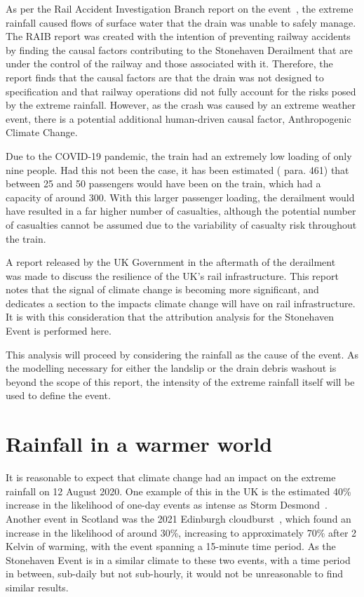\documentclass[12pt,a4paper,openany]{report}
\begin{document}
As per the Rail Accident Investigation Branch report on the event~\cite{RAIB_2022},
    the extreme rainfall caused flows of surface water that the drain was unable to safely manage.
The RAIB report was created with the intention of preventing railway accidents by finding the causal
    factors contributing to the Stonehaven Derailment that are under the control of the railway
    and those associated with it.
Therefore,
    the report finds that the causal factors are that the drain was not designed to specification
    and that railway operations did not fully account for the risks posed by the extreme rainfall.
However,
    as the crash was caused by an extreme weather event,
    there is a potential additional human-driven causal factor, Anthropogenic Climate Change.

Due to the COVID-19 pandemic,
    the train had an extremely low loading of only nine people.
Had this not been the case,
    it has been estimated (\cite{RAIB_2022} para. 461) that between 25 and 50 passengers would have been on the train,
    which had a capacity of around 300.
With this larger passenger loading,
    the derailment would have resulted in a far higher number of casualties,
    although the potential number of casualties cannot be assumed due to the variability of casualty risk throughout the train.

A report released by the UK Government in the aftermath of the derailment~\cite{NR_DfT_2021}
    was made to discuss the resilience of the UK's rail infrastructure.
This report notes that the signal of climate change is becoming more significant,
    and dedicates a section to the impacts climate change will have on rail infrastructure.
It is with this consideration that the attribution analysis for the Stonehaven Event is performed here.

This analysis will proceed by considering the rainfall as the cause of the event.
As the modelling necessary for either the landslip or the drain debris washout is beyond the scope of this report,
    the intensity of the extreme rainfall itself will be used to define the event.

\section{Rainfall in a warmer world}\label{sec:warmerrainfall}

It is reasonable to expect that climate change had an impact on the extreme rainfall on 12 August 2020.
One example of this in the UK is the estimated 40\% increase
    in the likelihood of one-day events as intense as Storm Desmond~\cite{Desmond_2015}.
Another event in Scotland was the 2021 Edinburgh cloudburst~\cite{Tett_Soon},
    which found an increase in the likelihood of around 30\%,
    increasing to approximately 70\% after 2 Kelvin of warming,
    with the event spanning a 15-minute time period.
As the Stonehaven Event is in a similar climate to these two events,
    with a time period in between,
    sub-daily but not sub-hourly,
    it would not be unreasonable to find similar results.
\end{document}

